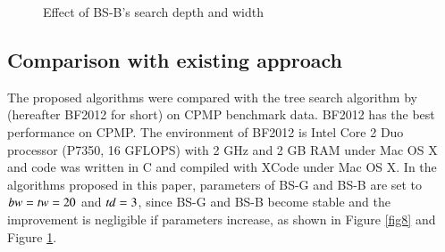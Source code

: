 \documentclass[review,3p,times,authoryear,12pt]{elsarticle}
\begin{document}
\begin{figure}[htbp]
\caption{Effect of BS-B's search depth and width}
\label{fig9}
\end{figure}

\subsection {Comparison with existing approach}

The proposed algorithms were compared with the tree search algorithm by \cite{BF2012} (hereafter BF2012 for short) on CPMP benchmark data. BF2012 has the best performance on CPMP. The environment of BF2012 is Intel Core 2 Duo processor (P7350, 16 GFLOPS) with 2 GHz and 2 GB RAM under Mac OS X and code was written in C and compiled with XCode under Mac OS X. In the algorithms proposed in this paper, parameters of BS-G and BS-B are set to $\id{bw}=\id{tw}=20$ and $\id{td}=3$, since BS-G and BS-B become stable and the improvement is negligible if parameters increase, as shown in Figure \ref{fig8} and Figure \ref{fig9}. 
\end{document}

